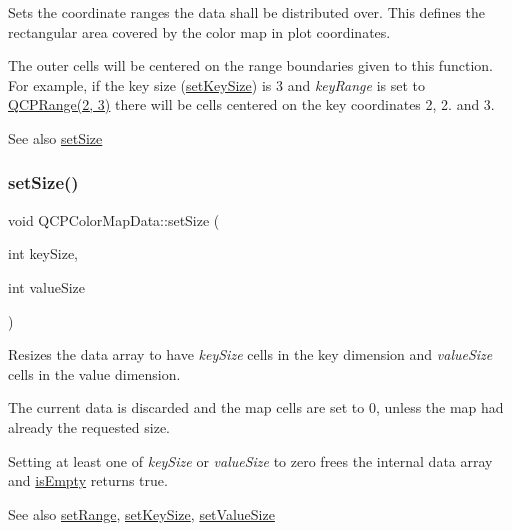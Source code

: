 Sets the coordinate ranges the data shall be distributed over. This defines the rectangular area covered by the color map in plot coordinates.

The outer cells will be centered on the range boundaries given to this function. For example, if the key size (\hyperlink{class_q_c_p_color_map_data_ac7ef70e383aface34b44dbde49234b6b}{set\+Key\+Size}) is 3 and {\itshape key\+Range} is set to {\ttfamily \hyperlink{class_q_c_p_range}{Q\+C\+P\+Range(2, 3)}} there will be cells centered on the key coordinates 2, 2. and 3.

\begin{DoxySeeAlso}{See also}
\hyperlink{class_q_c_p_color_map_data_a0d9ff35c299d0478b682bfbcdd9c097e}{set\+Size} 
\end{DoxySeeAlso}
\mbox{\label{class_q_c_p_color_map_data_a0d9ff35c299d0478b682bfbcdd9c097e}} 
\subsubsection{\texorpdfstring{set\+Size()}{setSize()}}
{\footnotesize\ttfamily void Q\+C\+P\+Color\+Map\+Data\+::set\+Size (\begin{DoxyParamCaption}\item[{int}]{key\+Size,  }\item[{int}]{value\+Size }\end{DoxyParamCaption})}

Resizes the data array to have {\itshape key\+Size} cells in the key dimension and {\itshape value\+Size} cells in the value dimension.

The current data is discarded and the map cells are set to 0, unless the map had already the requested size.

Setting at least one of {\itshape key\+Size} or {\itshape value\+Size} to zero frees the internal data array and \hyperlink{class_q_c_p_color_map_data_aea88cc75a76ca571acf29b2ba8ac970d}{is\+Empty} returns true.

\begin{DoxySeeAlso}{See also}
\hyperlink{class_q_c_p_color_map_data_aad9c1c7c703c1339489fc730517c83d4}{set\+Range}, \hyperlink{class_q_c_p_color_map_data_ac7ef70e383aface34b44dbde49234b6b}{set\+Key\+Size}, \hyperlink{class_q_c_p_color_map_data_a0893c9e3914513048b45e3429ffd16f2}{set\+Value\+Size} 
\end{DoxySeeAlso}
\mbox{\label{class_q_c_p_color_map_data_ada1b2680ba96a5f4175b6d341cf75d23}} 
